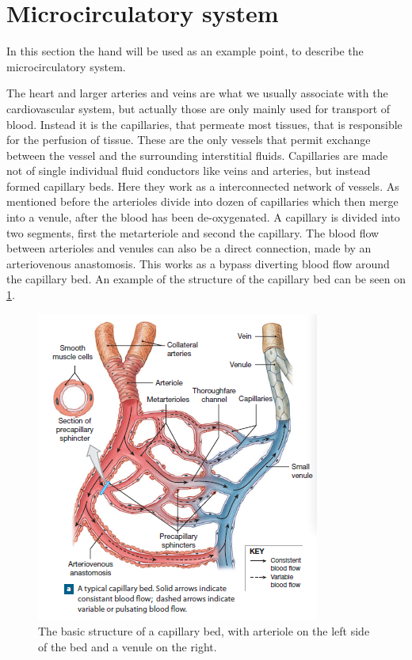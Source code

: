 
\section{Microcirculatory system}

In this section the hand will be used as an example point, to describe the microcirculatory system. 

The heart and larger arteries and veins are what we usually associate with the cardiovascular system, but actually those are only mainly used for transport of blood. Instead it is the capillaries, that permeate most tissues, that is responsible for the perfusion of tissue. These are the only vessels that permit exchange between the vessel and the surrounding interstitial fluids.    
Capillaries are made not of single individual fluid conductors like veins and arteries, but instead formed capillary beds. Here they work as a interconnected network of vessels. As mentioned before the arterioles divide into dozen of capillaries which then merge into a venule, after the blood has been de-oxygenated. A capillary is divided into two segments, first the metarteriole and second the capillary. The blood flow between arterioles and venules can also be a direct connection, made by an arteriovenous anastomosis. This works as a bypass diverting blood flow around the capillary bed. An example of the structure of the capillary bed can be seen on \cref{fig:beds}.\cite{martini2012}
\begin{figure}[H]                                         
	\includegraphics[width=.6\textwidth]{figures/capillary_bed}  
	\caption{The basic structure of a capillary bed, with arteriole on the left side of the bed and a venule on the right.}
	\label{fig:beds}  
\end{figure}          

